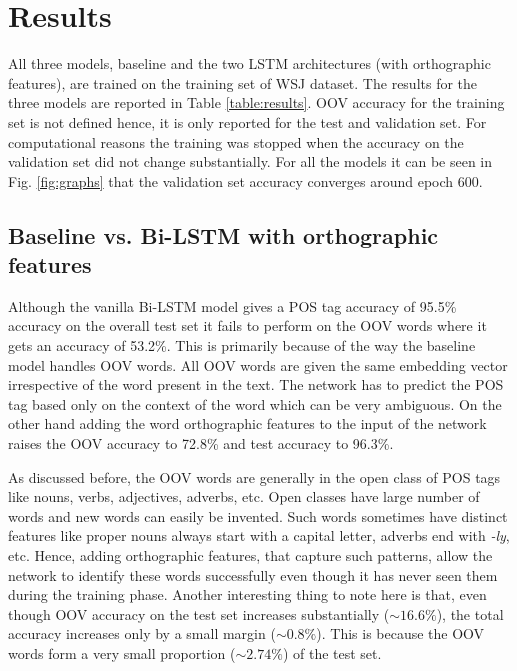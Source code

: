 \documentclass[11pt,letterpaper]{article}
\begin{document}
\section{Results}
All three models, baseline and the two LSTM architectures (with orthographic features), are trained on the training set of WSJ dataset. The results for the three models are reported in Table \ref{table:results}. OOV accuracy for the training set is not defined hence, it is only reported for the test and validation set. For computational reasons the training was stopped when the accuracy on the validation set did not change substantially. For all the models it can be seen in Fig. \ref{fig:graphs} that the validation set accuracy converges around epoch 600.

\subsection{Baseline vs. Bi-LSTM with orthographic features}
Although the vanilla Bi-LSTM model gives a POS tag accuracy of 95.5\% accuracy on the overall test set it fails to perform on the OOV words where it gets an accuracy of 53.2\%. This is primarily because of the way the baseline model handles OOV words. All OOV words are given the same embedding vector irrespective of the word present in the text. The network has to predict the POS tag based only on the context of the word which can be very ambiguous. On the other hand adding the word orthographic features to the input of the network raises the OOV accuracy to 72.8\% and test accuracy to 96.3\%.

As discussed before, the OOV words are generally in the open class of POS tags like nouns, verbs, adjectives, adverbs, etc. Open classes have large number of words and new words can easily be invented. Such words sometimes have distinct features like proper nouns always start with a capital letter, adverbs end with \emph{-ly}, etc. Hence, adding orthographic features, that capture such patterns, allow the network to identify these words successfully even though it has never seen them during the training phase. Another interesting thing to note here is that, even though OOV accuracy on the test set increases substantially ($\sim16.6\%$), the total accuracy increases only by a small margin ($\sim0.8\%$). This is because the OOV words form a very small proportion ($\sim2.74\%$) of the test set.
\end{document}
